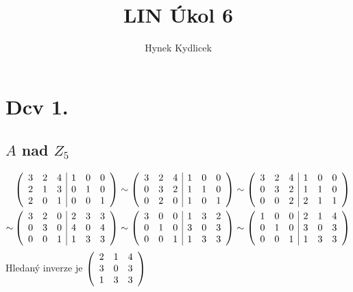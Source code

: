 \documentclass[a4paper]{article}
\author{Hynek Kydlicek}
\title{LIN Úkol 6}
\begin{document}
\maketitle
\section{Dcv 1.}%
\label{sec:Dcv 1.}
\subsection{$A$ nad $Z_5$}%
\begin{align*}
    &\left(
    \begin{array}{c c c | c c c }
        3 & 2 & 4 & 1 & 0 & 0 \\
        2 & 1 & 3 & 0 & 1 & 0 \\
        2 & 0 & 1 & 0 & 0 & 1
    \end{array}
    \right)
    \sim
    \left(
    \begin{array}{c c c | c c c }
        3 & 2 & 4 & 1 & 0 & 0 \\
        0 & 3 & 2 & 1 & 1 & 0 \\
        0 & 2 & 0 & 1 & 0 & 1
    \end{array}
    \right)
    \sim
    \left(
    \begin{array}{c c c | c c c }
        3 & 2 & 4 & 1 & 0 & 0 \\
        0 & 3 & 2 & 1 & 1 & 0 \\
        0 & 0 & 2 & 2 & 1 & 1
    \end{array}
    \right)\\
    \sim
    &\left(
    \begin{array}{c c c | c c c }
        3 & 2 & 0 & 2 & 3 & 3 \\
        0 & 3 & 0 & 4 & 0 & 4 \\
        0 & 0 & 1 & 1 & 3 & 3
    \end{array}
    \right)
    \sim
    \left(
    \begin{array}{c c c | c c c }
        3 & 0 & 0 & 1 & 3 & 2 \\
        0 & 1 & 0 & 3 & 0 & 3 \\
        0 & 0 & 1 & 1 & 3 & 3
    \end{array}
    \right)
    \sim
    \left(
    \begin{array}{c c c | c c c }
        1 & 0 & 0 & 2 & 1 & 4 \\
        0 & 1 & 0 & 3 & 0 & 3 \\
        0 & 0 & 1 & 1 & 3 & 3
    \end{array}
    \right)
\end{align*}
Hledaný inverze je
$
\left(
\begin{array}{c c c}
    2 & 1 & 4 \\
    3 & 0 & 3 \\
    1 & 3 & 3
\end{array}
\right)
$\\
\end{document}
